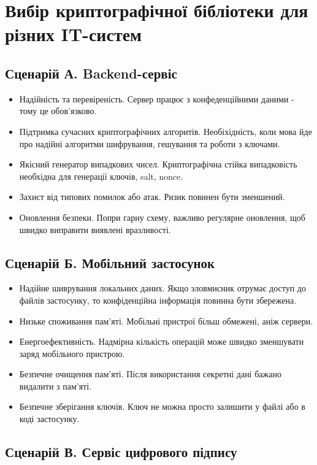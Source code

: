 \section{Вибір криптографічної бібліотеки для різних IT-систем}

\subsection{Сценарій А. Backend-сервіс}

\begin{itemize}
    \item Надійність та перевіреність. Сервер працює з конфеденційними даними - тому це обов'язково.
    \item Підтримка сучасних криптографічних алгоритів. Необіхідність, коли мова йде про надійні алгоритми шифрування, гешування та роботи з ключами.
    \item Якісний генератор випадкових чисел. Криптографічна стійка випадковість необхідна для генерації ключів, salt, nonce.
    \item Захист від типових помилок або атак. Ризик повинен бути зменшений.
    \item Оновлення безпеки. Попри гарну схему, важливо регулярне оновлення, щоб швидко виправити виявлені вразливості.
\end{itemize}

\subsection{Сценарій Б. Мобільний застосунок}

\begin{itemize}
    \item Надійне шиврування локальних даних. Якщо зловмисник отрумає доступ до файлів застосунку, то конфіденційна інформація повинна бути збережена.
    \item Низьке споживання пам'яті. Мобільні пристрої більш обмежені, аніж сервери.
    \item Енергоефективність. Надмірна кількість операцій може швидко зменшувати заряд мобільного пристрою.
    \item Безпечне очищення пам'яті. Після використання секретні дані бажано видалити з пам'яті.
    \item Безпечне зберігання ключів. Ключ не можна просто залишити у файлі або в коді застосунку.
\end{itemize}

\subsection{Сценарій В. Сервіс цифрового підпису}

